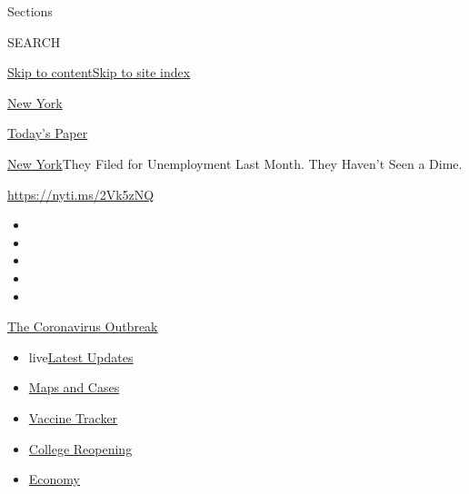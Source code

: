 Sections

SEARCH

\protect\hyperlink{site-content}{Skip to
content}\protect\hyperlink{site-index}{Skip to site index}

\href{https://www.nytimes.com/section/nyregion}{New York}

\href{https://myaccount.nytimes.com/auth/login?response_type=cookie\&client_id=vi}{}

\href{https://www.nytimes.com/section/todayspaper}{Today's Paper}

\href{/section/nyregion}{New York}\textbar{}They Filed for Unemployment
Last Month. They Haven't Seen a Dime.

\url{https://nyti.ms/2Vk5zNQ}

\begin{itemize}
\item
\item
\item
\item
\item
\end{itemize}

\href{https://www.nytimes.com/news-event/coronavirus?action=click\&pgtype=Article\&state=default\&region=TOP_BANNER\&context=storylines_menu}{The
Coronavirus Outbreak}

\begin{itemize}
\tightlist
\item
  live\href{https://www.nytimes.com/2020/08/04/world/coronavirus-cases.html?action=click\&pgtype=Article\&state=default\&region=TOP_BANNER\&context=storylines_menu}{Latest
  Updates}
\item
  \href{https://www.nytimes.com/interactive/2020/us/coronavirus-us-cases.html?action=click\&pgtype=Article\&state=default\&region=TOP_BANNER\&context=storylines_menu}{Maps
  and Cases}
\item
  \href{https://www.nytimes.com/interactive/2020/science/coronavirus-vaccine-tracker.html?action=click\&pgtype=Article\&state=default\&region=TOP_BANNER\&context=storylines_menu}{Vaccine
  Tracker}
\item
  \href{https://www.nytimes.com/2020/08/02/us/covid-college-reopening.html?action=click\&pgtype=Article\&state=default\&region=TOP_BANNER\&context=storylines_menu}{College
  Reopening}
\item
  \href{https://www.nytimes.com/live/2020/08/04/business/stock-market-today-coronavirus?action=click\&pgtype=Article\&state=default\&region=TOP_BANNER\&context=storylines_menu}{Economy}
\end{itemize}

